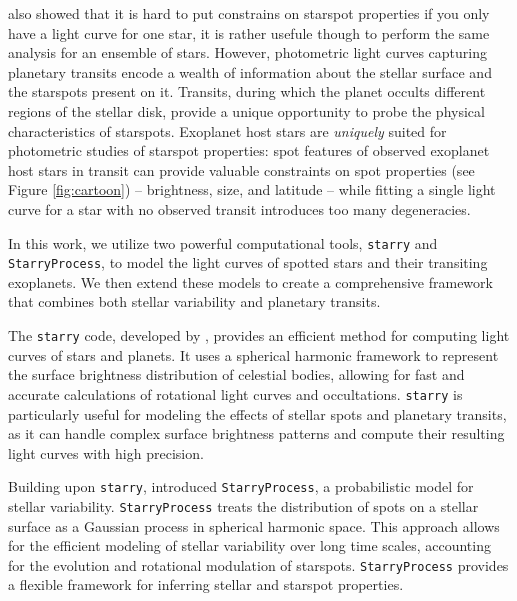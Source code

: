 \documentclass[twocolumn]{aastex631}
\begin{document}
\cite{Luger2021b} also showed that it is hard to put constrains on starspot properties if you only have a light curve for 
one star, it is rather usefule though to perform the same analysis for an ensemble of stars. However, photometric light curves capturing planetary transits encode 
a wealth of information about the stellar surface and the starspots present on it. Transits, during which the planet occults different regions of 
the stellar disk, provide a unique opportunity to probe the physical characteristics of starspots. Exoplanet host stars are \textit{uniquely} suited 
for photometric studies of starspot properties: spot features of observed exoplanet host stars in transit can provide valuable 
constraints on spot properties (see Figure \ref{fig:cartoon}) -- brightness, size, and latitude -- while fitting a single light curve for a star 
with no observed transit introduces too many degeneracies.

In this work, we utilize two powerful computational tools, \texttt{starry} and \texttt{StarryProcess}, to model the light curves of spotted stars and 
their transiting exoplanets. We then extend these models to create a comprehensive framework that combines both stellar variability and planetary transits.

The \texttt{starry} code, developed by \cite{Luger2019}, provides an efficient method for computing light curves of stars and planets. 
It uses a spherical harmonic framework to represent the surface brightness distribution of celestial bodies, allowing for fast and accurate 
calculations of rotational light curves and occultations. \texttt{starry} is particularly useful for modeling the effects of stellar spots 
and planetary transits, as it can handle complex surface brightness patterns and compute their resulting light curves with high precision.

Building upon \texttt{starry}, \cite{Luger2021b} introduced \texttt{StarryProcess}, a probabilistic model for stellar variability. \texttt{StarryProcess} 
treats the distribution of spots on a stellar surface as a Gaussian process in spherical harmonic space. This approach allows for the efficient 
modeling of stellar variability over long time scales, accounting for the evolution and rotational modulation of starspots. \texttt{StarryProcess} 
provides a flexible framework for inferring stellar and starspot properties.
\end{document}
